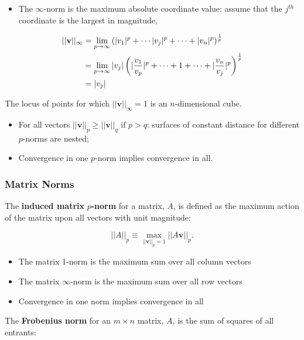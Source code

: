 \documentclass[12pt, twoside, draft]{article}
\begin{document}
\begin{itemize}
\item The $\infty$-norm is the maximum absolute coordinate value: assume that the $j^{th}$ coordinate is the largest in magnitude,
\end{itemize}
\begin{align}\label{eq:infinity_norm}
||\mathbf{v}||_\infty &= \lim_{p\to\infty} \left( |v_1|^p + \cdots |v_j|^p + \cdots + |v_n|^p \right)^\frac{1}{p} \notag \\
&= \lim_{p\to\infty} |v_j| \left( |\frac{v_1}{v_p}|^p + \cdots + 1 + \cdots + |\frac{v_n}{v_j}|^p \right)^\frac{1}{p} \notag \\ 
&= |v_j|
\end{align}

\hspace{20pt}The locus of points for which $||\mathbf{v}||_\infty = 1$ is an $n$-dimensional cube.

\begin{itemize}
\item For all vectors $||\mathbf{v}||_p \geq ||\mathbf{v}||_q \text{ if } p > q$: surfaces of constant distance for different $p$-norms are nested;
\item Convergence in one $p$-norm implies convergence in all.
\end{itemize}

\subsubsection{Matrix Norms}\label{sec:matrix-norms}
The \textbf{induced matrix }$p$\textbf{-norm} for a matrix, $A$, is defined as the maximum action of the matrix upon all vectors with unit magnitude:

\begin{equation}\label{eq:matrix_pnorm}
||A||_p \equiv \max_{||\mathbf{v}||_p = 1} ||A\mathbf{v}||_p .
\end{equation}

\begin{itemize}[noitemsep]
\item The matrix 1-norm is the maximum sum over all column vectors
\item The matrix $\infty$-norm is the maximum sum over all row vectors
\item Convergence in one norm implies convergence in all
\end{itemize}

The \textbf{Frobenius norm} for an $m \times n$ matrix, $A$, is the sum of squares of all entrants:
\end{document}
